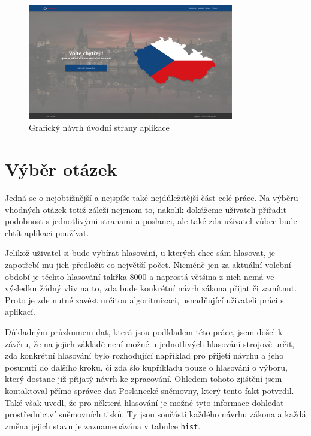 \begin{figure}
    \centering
    \includegraphics[width=0.8\textwidth]{obrazky-figures/Homepage.pdf}
    \caption{Grafický návrh úvodní strany aplikace}
    \label{fig:graphic-homepage}
\end{figure}


\section{Výběr otázek}
Jedná se o nejobtížnější a nejspíše také nejdůležitější část celé práce. Na výběru vhodných otázek totiž záleží nejenom to, nakolik dokážeme uživateli přiřadit podobnost s jednotlivými stranami a poslanci, ale také zda uživatel vůbec bude chtít aplikaci používat.\\

\par Jelikož uživatel si bude vybírat hlasování, u kterých chce sám hlasovat, je zapotřebí mu jich předložit co největší počet. Nicméně jen za aktuální volební období je těchto hlasování takřka 8000 a naprostá většina z nich nemá ve výsledku žádný vliv na to, zda bude konkrétní návrh zákona přijat či zamítnut. Proto je zde nutné zavést určitou algoritmizaci, usnadňující uživateli práci s aplikací. \\

\par Důkladným průzkumem dat, která jsou podkladem této práce, jsem došel k závěru, že na jejich základě není možné u jednotlivých hlasování strojově určit, zda konkrétní hlasování bylo rozhodující například pro přijetí návrhu a jeho posunutí do dalšího kroku, či zda šlo kupříkladu pouze o hlasování o výboru, který dostane již přijatý návrh ke zpracování. Ohledem tohoto zjištění jsem kontaktoval přímo správce dat Poslanecké sněmovny, který tento fakt potvrdil. Také však uvedl, že pro některá hlasování je možné tyto informace dohledat prostřednictví sněmovních tisků. Ty jsou součástí každého návrhu zákona a každá změna jejich stavu je zaznamenávána v tabulce \texttt{hist}.\\

